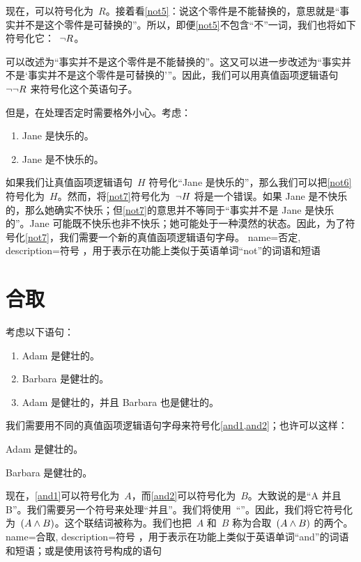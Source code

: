 现在，可以符号化为~$R$。接着看\cref*{not5}：说这个零件是不能替换的，意思就是“事实并不是这个零件是可替换的”。所以，即便\cref*{not5}不包含“不”一词，我们也将如下符号化它：~$\neg R$。

可以改述为“事实并不是这个零件是不能替换的”。这又可以进一步改述为“事实并不是‘事实并不是这个零件是可替换的’”。因此，我们可以用真值函项逻辑语句~$\neg\neg R$ 来符号化这个英语句子。

但是，在处理否定时需要格外小心。考虑：


\begin{enumerate}
		\item\label{not6} Jane 是快乐的。
		\item\label{not7} Jane 是不快乐的。
	\end{enumerate}


如果我们让真值函项逻辑语句~$H$ 符号化“Jane 是快乐的”，那么我们可以把\cref*{not6}符号化为~$H$。然而，将\cref*{not7}符号化为~$\neg{H}$ 将是一个错误。如果 Jane 是不快乐的，那么她确实不快乐；但\cref*{not7}的意思并不等同于“事实并不是 Jane 是快乐的”。Jane 可能既不快乐也非不快乐；她可能处于一种漠然的状态。因此，为了符号化\cref*{not7}，我们需要一个新的真值函项逻辑语句字母。
{
name=否定,
description={符号 \enot，用于表示在功能上类似于英语单词“not”的词语和短语}
}

\section{合取}
\label{s:ConnectiveConjunction}

考虑以下语句：


\begin{enumerate}
		\item\label{and1} Adam 是健壮的。
		\item\label{and2} Barbara 是健壮的。
		\item\label{and3} Adam 是健壮的，并且 Barbara 也是健壮的。
	\end{enumerate}


我们需要用不同的真值函项逻辑语句字母来符号化\cref*{and1,and2}；也许可以这样：


\begin{ekey}
		\item[A] Adam 是健壮的。
		\item[B] Barbara 是健壮的。
	\end{ekey}


现在，\cref*{and1}可以符号化为~$A$，而\cref*{and2}可以符号化为~$B$。大致说的是“A 并且 B”。我们需要另一个符号来处理“并且”。我们将使用~“\eand”。因此，我们将它符号化为~$(A\wedge B)$。这个联结词被称为。我们也把~$A$ 和~$B$ 称为合取~$(A \wedge B)$ 的两个。
{
name=合取,
description={符号 \eand，用于表示在功能上类似于英语单词“and”的词语和短语；或是使用该符号构成的语句}
}

